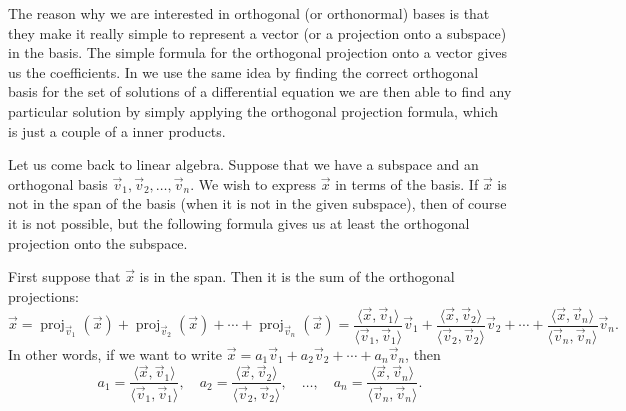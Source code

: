 \documentclass{ximera}
\begin{document}
The reason why we are interested in orthogonal (or orthonormal) bases is that they make it really simple to represent a vector (or a projection onto a subspace) in the basis.  The simple formula for the orthogonal projection onto a vector gives us the coefficients.  In  we use the same idea by finding the correct orthogonal basis for the set of solutions of a differential equation we are then able to find any particular solution by simply applying the orthogonal projection formula, which is just a couple of a inner products.

Let us come back to linear algebra.  Suppose that we have a subspace and an orthogonal basis $\vec{v}_1, \vec{v}_2, \ldots, \vec{v}_n$.  We wish to express $\vec{x}$ in terms of the basis.  If $\vec{x}$ is not in the span of the basis (when it is not in the given subspace), then of course it is not possible, but the following formula gives us at least the orthogonal projection onto the subspace.

First suppose that $\vec{x}$ is in the span.  Then it is the sum of the orthogonal projections:
\begin{equation*}
    \vec{x} = \operatorname{proj}_{\vec{v}_1} ( \vec{x} )+\operatorname{proj}_{\vec{v}_2} ( \vec{x} ) 
        + \cdots + \operatorname{proj}_{\vec{v}_n} ( \vec{x} )
    =\frac{\langle \vec{x}, \vec{v}_1 \rangle}{\langle \vec{v}_1, \vec{v}_1 \rangle}
    \vec{v}_1 + \frac{\langle \vec{x}, \vec{v}_2 \rangle}{\langle \vec{v}_2, \vec{v}_2 \rangle}
    \vec{v}_2 + \cdots + \frac{\langle \vec{x}, \vec{v}_n \rangle}{\langle \vec{v}_n, \vec{v}_n \rangle}
    \vec{v}_n .
\end{equation*}
In other words, if we want to write
$\vec{x} = a_1 \vec{v}_1 + a_2 \vec{v}_2 + \cdots + a_n \vec{v}_n$, then
\begin{equation*}
    a_1 = \frac{\langle \vec{x}, \vec{v}_1 \rangle}{\langle \vec{v}_1, \vec{v}_1 \rangle} , \quad
    a_2 = \frac{\langle \vec{x}, \vec{v}_2 \rangle}{\langle \vec{v}_2, \vec{v}_2 \rangle} , \quad \ldots , \quad
    a_n = \frac{\langle \vec{x}, \vec{v}_n \rangle}{\langle \vec{v}_n, \vec{v}_n \rangle} .
\end{equation*}
\end{document}
